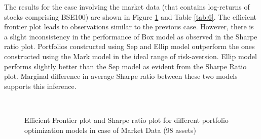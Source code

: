 The results for the case involving the market data (that contains log-returns of stocks comprising BSE100) are shown in Figure \ref{fig:6} and Table \ref{tab:6}. The efficient frontier plot leads to observations similar to the previous case. However, there is a slight inconsistency in the performance of Box model as observed in the Sharpe ratio plot. Portfolios constructed using Sep and Ellip model outperform the ones constructed using the Mark model in the ideal range of risk-aversion. Ellip model performs slightly better than the Sep model as evident from the Sharpe Ratio plot. Marginal difference in average Sharpe ratio between these two models supports this inference.
\begin{figure}[!h]
    
    
     \hfill
   \\
   \caption{Efficient Frontier plot and Sharpe ratio plot for different portfolio optimization models in case of Market Data (98 assets)}
   \label{fig:6}
\end{figure}

